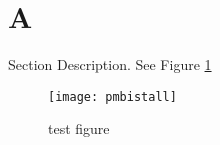 \section{A}
\label{sect:bg-blocks}
Section Description.  
See Figure \ref{fig:pmbistall} 

\begin{figure}[H]
  \centering
  \texttt{[image: pmbistall]}
  \caption{test figure}
  \label{fig:pmbistall}
\end{figure}



